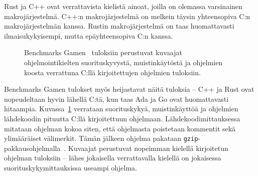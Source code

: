 Rust ja C++ ovat verrattavista kielistä ainoat, joilla on olemassa varsinainen
makrojärjestelmä. C++:n makrojärjestelmä on melkein täysin yhteensopiva C:n
makrojärjestelmän kanssa. Rustin makrojärjestelmä on taas huomattavasti
ilmaisukykyisempi, mutta epäyhteensopiva C:n kanssa.

\newpage

\begin{figure}[ht!]
    \begin{adjustbox}{center}
    \begin{minipage}{1.15\textwidth}
    \begin{minipage}{0.5\textwidth}
        
        \vspace*{-0.8cm}
    \end{minipage}
    \begin{minipage}{0.5\textwidth}
        
        \vspace*{-0.9cm}
    \end{minipage}
    \end{minipage}
    \end{adjustbox}
    \begin{adjustbox}{center}
    \begin{minipage}{1.15\textwidth}
    \end{minipage}
    \end{adjustbox}
    \caption{
        Benchmarks Gamen~\citep[tiedot haettu 10.1.2019]{benchmarks} tuloksiin
        perustuvat kuvaajat ohjelmointikielten suorituskyvystä, muistinkäytöstä
        ja ohjelmien koosta verrattuna C:llä kirjoitettujen ohjelmien
        tuloksiin.}
    \label{fig:benchmarksgame}
\end{figure}

\FloatBarrier

Benchmarks Gamen tulokset myös heijastavat näitä tuloksia -- C++ ja Rust ovat
nopeudeltaan hyvin lähellä C:tä, kun taas Ada ja Go ovat huomattavasti
hitaampia. Kuvassa~\ref{fig:benchmarksgame} verrataan suorituskykyä,
muistinkäyttöä ja ohjelmien lähdekoodin pituutta C:llä kirjoitettuun ohjelmaan.
Lähdekoodimittauksessa mitataan ohjelman kokoa siten, että ohjelmasta
poistetaan kommentit sekä ylimääräiset välimerkit. Tämän jälkeen ohjelma
pakataan \texttt{gzip}-pakkausohjelmalla~\citep{howmeasured}. Kuvaajat
perustuvat nopeimman kielellä kirjoitetun ohjelman tuloksiin -- lähes
jokaisella verrattavalla kielellä on jokaisessa suorituskykymittauksissa
useampi ohjelma.

